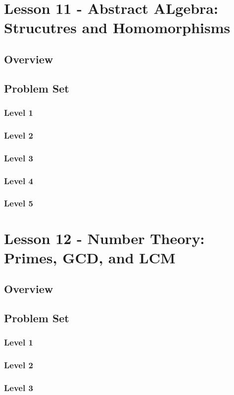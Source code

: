 \documentclass{article}
\begin{document}
\section{Lesson 11 - Abstract ALgebra: Strucutres and Homomorphisms}
\subsection{Overview}
\subsection{Problem Set}
\subsubsection{Level 1}
\subsubsection{Level 2}
\subsubsection{Level 3}
\subsubsection{Level 4}
\subsubsection{Level 5}
\pagebreak

\section{Lesson 12 - Number Theory: Primes, GCD, and LCM}
\subsection{Overview}
\subsection{Problem Set}
\subsubsection{Level 1}
\subsubsection{Level 2}
\subsubsection{Level 3}
\end{document}
